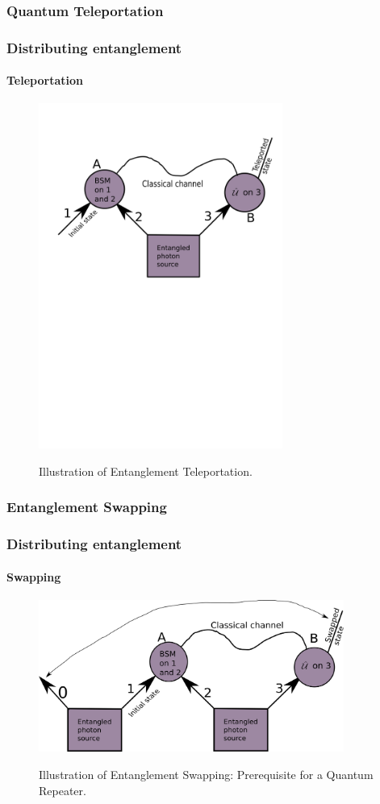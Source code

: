 \documentclass[serif,8pt]{beamer}
\begin{document}
\subsubsection{Quantum Teleportation}
\begin{frame}[t]
    \frametitle{Distributing entanglement}
    \framesubtitle{Teleportation}
    \begin{figure}[]
      \centering
      \caption{Illustration of Entanglement Teleportation.}
      \includegraphics[width=8cm]{EntanglementTeleportation.png}
	\label{fig:Tele}
    \end{figure}
\end{frame}



\subsubsection{Entanglement Swapping}
\addtocounter{framenumber}{-1}
\begin{frame}[t]
    \frametitle{Distributing entanglement}
    \framesubtitle{Swapping}
\begin{figure}[]
      \centering
      \caption{Illustration of Entanglement Swapping: Prerequisite for a Quantum Repeater.}
      \includegraphics[width=10cm]{EntanglementSwapping.png}
	\label{fig:Swap}
    \end{figure}

\end{frame}
\end{document}
